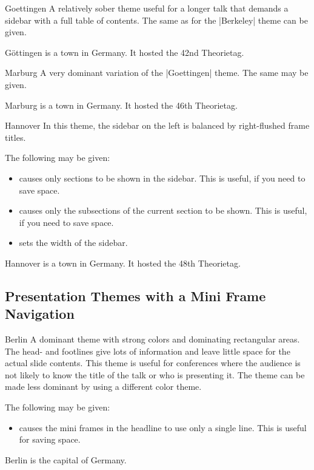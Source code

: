 \begin{themeexample}{Goettingen}
  A relatively sober theme useful for a longer talk that demands a sidebar with a full table of contents.  The same  as for the |Berkeley| theme can be given.

  G\"ottingen is a town in Germany. It hosted the 42nd Theorietag.
\end{themeexample}

\begin{themeexample}{Marburg}
  A very dominant variation of the |Goettingen| theme. The same  may be given.

  Marburg is a town in Germany. It hosted the 46th Theorietag.
\end{themeexample}

\begin{themeexample}{Hannover}
  In this theme, the sidebar on the left is balanced by right-flushed frame titles.

  The following  may be given:
  \begin{itemize}
  \item {} causes only sections to be shown in the sidebar. This is useful, if you need to save space.
  \item {} causes only the subsections of the current section to be shown. This is useful, if you need to save space.
  \item {} sets the width of the sidebar.
  \end{itemize}

  Hannover is a town in Germany. It hosted the 48th Theorietag.
\end{themeexample}


\subsection{Presentation Themes with a Mini Frame Navigation}

\begin{themeexample}{Berlin}
  A dominant theme with strong colors and dominating rectangular areas. The head- and footlines give lots of information and leave little space for the actual slide contents. This theme is useful for conferences where the audience is not likely to know the title of the talk or who is presenting it. The theme can be made less dominant by using a different color theme.

  The following  may be given:
  \begin{itemize}
  \item {} causes the mini frames in the headline to use only a single line. This is useful for saving space.
  \end{itemize}

  Berlin is the capital of Germany.
\end{themeexample}

